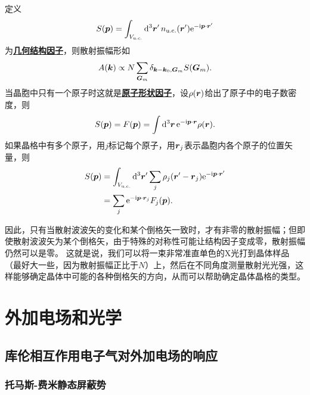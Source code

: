 \documentclass[hyperref, UTF8, a4paper]{ctexart}
\newcommand*{\ii}{\mathrm{i}}
\newcommand*{\ee}{\mathrm{e}}
\newcommand*{\concept}[1]{\underline{\textbf{#1}}}
\begin{document}
定义
\begin{equation}
    S(\vb*{p}) = \int_{V_{\text{u.c.}}} \dd[3]{\vb*{r}'} n_\text{u.c.}(\vb*{r}') \ee^{-\ii \vb*{p} \cdot \vb*{r}'}
\end{equation}
为\concept{几何结构因子}，则散射振幅形如
\begin{equation}
    A(\vb*{k}) \propto N \sum_{\vb*{G}_m} \delta_{\vb*{k} - \vb*{k}_0, \vb*{G}_m} S(\vb*{G}_m).
\end{equation}
当晶胞中只有一个原子时这就是\concept{原子形状因子}，设$\rho(\vb*{r})$给出了原子中的电子数密度，则
\begin{equation}
    S(\vb*{p}) = F(\vb*{p}) = \int \dd[3]{\vb*{r}} \ee^{-\ii \vb*{p} \cdot \vb*{r}} \rho(\vb*{r}).
\end{equation}
如果晶格中有多个原子，用$j$标记每个原子，用$\vb*{r}_j$表示晶胞内各个原子的位置矢量，则
\begin{equation}
    \begin{aligned}
        S(\vb*{p}) &= \int_{V_{\text{u.c.}}} \dd[3]{\vb*{r}'} \sum_j \rho_j(\vb*{r}' - \vb*{r}_j) \ee^{-\ii \vb*{p} \cdot \vb*{r}'} \\
        &= \sum_j \ee^{-\ii \vb*{p} \cdot \vb*{r}_j} F_j(\vb*{p}).
    \end{aligned}
\end{equation}

因此，只有当散射波波矢的变化和某个倒格矢一致时，才有非零的散射振幅；但即使散射波波矢为某个倒格矢，由于特殊的对称性可能让结构因子变成零，散射振幅仍然可以是零。
这就是说，我们可以将一束非常准直单色的X光打到晶体样品（最好大一些，因为散射振幅正比于$N$）上，然后在不同角度测量散射光光强，这样能够确定晶体中可能的各种倒格矢的方向，从而可以帮助确定晶体晶格的类型。

\section{外加电场和光学}

\subsection{库伦相互作用电子气对外加电场的响应}\label{sec:ext-e}

\subsubsection{托马斯-费米静态屏蔽势}
\end{document}
